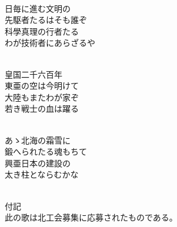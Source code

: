 \documentclass[10pt,b5j]{tarticle} %
\begin{document}
\begin{enumerate}
\begin{minipage}[c]{\blocksize}
    \end{minipage}
    \begin{minipage}[c]{\blocksize}
        
        \vspace{\linespace}
        \item~\\
        日毎に進む文明の\\
        先駆者たるはそも誰ぞ\\
        科學真理の行者たる\\
        わが技術者にあらざるや
        
    \end{minipage}
    \begin{minipage}[c]{\blocksize}
        
        \vspace{\linespace}
        \item~\\
        皇国二千六百年\\
        東亜の空は今明けて\\
        大陸もまたわが家ぞ\\
        若き戦士の血は躍る
        
    \end{minipage}
    \begin{minipage}[c]{\blocksize}
        
        \vspace{\linespace}
        \item~\\
        あゝ北海の霜雪に\\
        鍛へられたる魂もちて\\
        興亜日本の建設の\\
        太き柱とならむかな
        
    \end{minipage}
    \begin{minipage}[c]{\blocksize}
        
        \vspace{\linespace}
        \item~\\
        付記\\
        此の歌は北工会募集に応募されたものである。
    
    \end{minipage}
\end{enumerate} %
\end{document}
